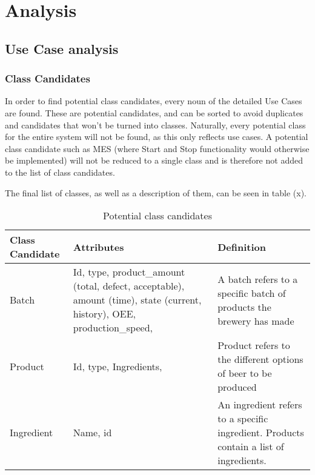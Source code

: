 \section{Analysis}

\subsection{Use Case analysis}

\subsubsection{Class Candidates}
In order to find potential class candidates, every noun of the detailed Use Cases are found.
These are potential candidates, and can be sorted to avoid duplicates and candidates that 
won’t be turned into classes. Naturally, every potential class for the entire system will 
not be found, as this only reflects use cases. A potential class candidate such as MES 
(where Start and Stop functionality would otherwise be implemented) will not be reduced to 
a single class and is therefore not added to the list of class candidates.

The final list of classes, as well as a description of them, can be seen in table (x).

\begin{table}[ht]
    \begin{tabularx}{\textwidth}{|>{\RaggedRight}p{4cm}|>{\RaggedRight}p{6cm}|>{\RaggedRight}X|}
    \hline
    \textbf{Class Candidate} & \textbf{Attributes}                                                                                                     & \textbf{Definition}                                                                    \\ \hline
    Batch                    & Id, type, product\_amount (total, defect, acceptable), amount (time), state (current, history), OEE, production\_speed, & A batch refers to a specific batch of products the brewery has made                    \\ \hline
    Product                  & Id, type, Ingredients,                                                                                                  & Product refers to the different options of beer to be produced                         \\ \hline
    Ingredient               & Name, id                                                                                                                & An ingredient refers to a specific ingredient. Products contain a list of ingredients. \\ \hline
    \end{tabularx}
    \caption{Potential class candidates}
    \label{table:class_candidates}
    \end{table}

